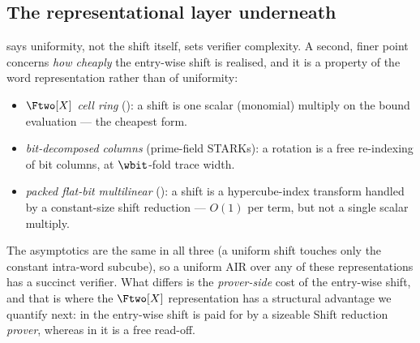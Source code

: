 \subsection{The representational layer underneath}
\label{sec:shifts-repr}

 says uniformity, not the shift itself, sets
verifier complexity. A second, finer point concerns \emph{how cheaply}
the entry-wise shift is realised, and it is a property of the word
representation rather than of uniformity:
\begin{itemize}
  \item \emph{$\Ftwo[X]$ cell ring} (\zinc{}): a shift is one scalar
  (monomial) multiply on the bound evaluation --- the cheapest form.
  \item \emph{bit-decomposed columns} (prime-field STARKs): a rotation is
  a free re-indexing of bit columns, at $\wbit$-fold trace width.
  \item \emph{packed flat-bit multilinear} (\binius{}): a shift is a
  hypercube-index transform handled by a constant-size shift reduction
  --- $O(1)$ per term, but not a single scalar multiply.
\end{itemize}
The asymptotics are the same in all three (a uniform shift touches only
the constant intra-word subcube), so a uniform AIR over any of these
representations has a succinct verifier. What differs is the
\emph{prover-side} cost of the entry-wise shift, and that is where the
$\Ftwo[X]$ representation has a structural advantage we quantify next:
in \binius{} the entry-wise shift is paid for by a sizeable Shift
reduction \emph{prover}, whereas in \zinc{} it is a free read-off.
